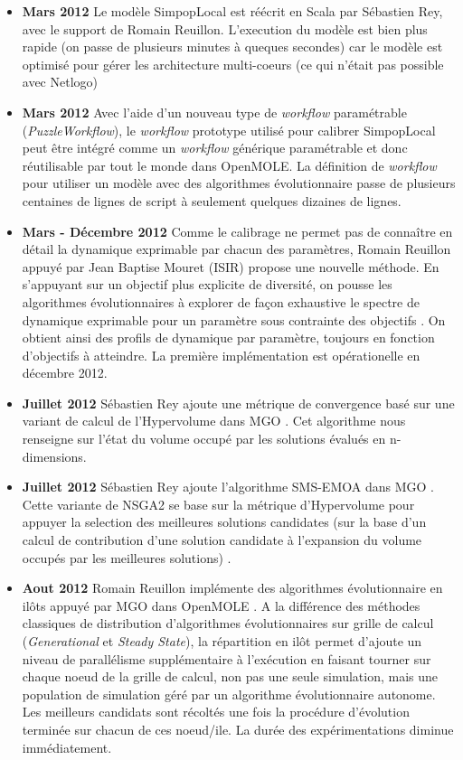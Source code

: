 \begin{itemize}[label=\textbullet]
\item {\textbf{Mars 2012}} Le modèle SimpopLocal est réécrit en Scala par Sébastien Rey, avec le support de Romain Reuillon. L'execution du modèle est bien plus rapide (on passe de plusieurs minutes à queques secondes) car le modèle est optimisé pour gérer les architecture multi-coeurs (ce qui n'était pas possible avec Netlogo)

\item {\textbf{Mars 2012}} Avec l'aide d'un nouveau type de \textit{workflow} paramétrable (\textit{PuzzleWorkflow}), le \textit{workflow} prototype utilisé pour calibrer SimpopLocal peut être intégré comme un \textit{workflow} générique paramétrable et donc réutilisable par tout le monde dans OpenMOLE. La définition de \textit{workflow} pour utiliser un modèle avec des algorithmes évolutionnaire passe de plusieurs centaines de lignes de script à seulement quelques dizaines de lignes. 

\item {\textbf{Mars - Décembre 2012}} Comme le calibrage ne permet pas de connaître en détail la dynamique exprimable par chacun des paramètres, Romain Reuillon appuyé par Jean Baptise Mouret (ISIR) propose une nouvelle méthode. En s'appuyant sur un objectif plus explicite de diversité, on pousse les algorithmes évolutionnaires à explorer de façon exhaustive le spectre de dynamique exprimable pour un paramètre sous contrainte des objectifs \autocite{Reuillon2015}. On obtient ainsi des profils de dynamique par paramètre, toujours en fonction d'objectifs à atteindre. La première implémentation est opérationelle en décembre 2012.

\item {\textbf{Juillet 2012}} Sébastien Rey ajoute une métrique de convergence basé sur une variant de calcul de l'Hypervolume dans MGO \autocite{Fonseca2006}. Cet algorithme nous renseigne sur l'état du volume occupé par les solutions évalués en n-dimensions. 

\item {\textbf{Juillet 2012}} Sébastien Rey ajoute l'algorithme SMS-EMOA dans MGO \autocite{Emmerich2005}. Cette variante de NSGA2 se base sur la métrique d'Hypervolume pour appuyer la selection des meilleures solutions candidates (sur la base d'un calcul de contribution d'une solution candidate à l'expansion du volume occupés par les meilleures solutions) .

\item {\textbf{Aout 2012}} Romain Reuillon implémente des algorithmes évolutionnaire en ilôts appuyé par MGO dans OpenMOLE \autocite{Whitley1997}. A la différence des méthodes classiques de distribution d'algorithmes évolutionnaires sur grille de calcul (\textit{Generational} et \textit{Steady State}), la répartition en ilôt permet d'ajoute un niveau de parallélisme supplémentaire à l'exécution en faisant tourner sur chaque noeud de la grille de calcul, non pas une seule simulation, mais une population de simulation géré par un algorithme évolutionnaire autonome. Les meilleurs candidats sont récoltés une fois la procédure d'évolution terminée sur chacun de ces noeud/ile. La durée des expérimentations diminue immédiatement.


\end{itemize}
